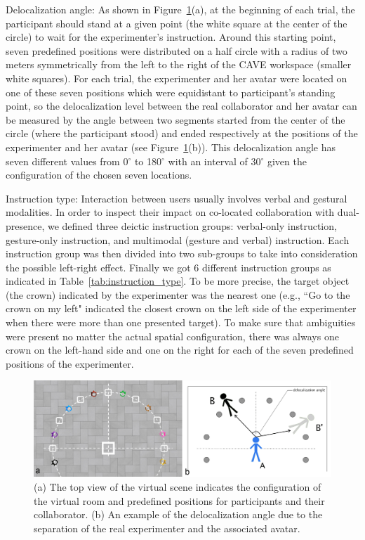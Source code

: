 Delocalization angle: As shown in Figure~\ref{fig:2_floor}(a), at the beginning of each trial, the participant should stand at a given point (the white square at the center of the circle) to wait for the experimenter's instruction. Around this starting point, seven predefined positions were distributed on a half circle with a radius of two meters symmetrically from the left to the right of the CAVE workspace (smaller white squares). For each trial, the experimenter and her avatar were located on one of these seven positions which were equidistant to participant's standing point, so the delocalization level between the real collaborator and her avatar can be measured by the angle between two segments started from the center of the circle (where the participant stood) and ended respectively at the positions of the experimenter and her avatar (see Figure~\ref{fig:2_floor}(b)). This delocalization angle has seven different values from 0$^\circ$ to 180$^\circ$ with an interval of 30$^\circ$ given the configuration of the chosen seven locations.

Instruction type: Interaction between users usually involves verbal and gestural modalities. In order to inspect their impact on co-located collaboration with dual-presence, we defined three deictic instruction groups: verbal-only instruction, gesture-only instruction, and multimodal (gesture and verbal) instruction. Each instruction group was then divided into two sub-groups to take into consideration the possible left-right effect. Finally we got 6 different instruction groups as indicated in Table~\ref{tab:instruction_type}. To be more precise, the target object (the crown) indicated by the experimenter was the nearest one (e.g., ``Go to the crown on my left" indicated the closest crown on the left side of the experimenter when there were more than one presented target). To make sure that ambiguities were present no matter the actual spatial configuration, there was always one crown on the left-hand side and one on the right for each of the seven predefined positions of the experimenter.

\begin{figure}[ht]
  \centering
  \includegraphics[width=\textwidth]{figures/2_floor}
  \caption{\label{fig:2_floor}(a) The top view of the virtual scene indicates the configuration of the virtual room and predefined positions for participants and their collaborator. (b) An example of the delocalization angle due to the separation of the real experimenter and the associated avatar.}
\end{figure}

